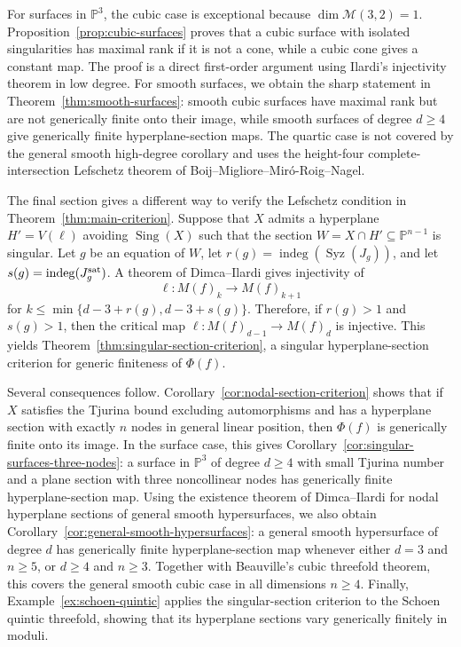 \documentclass[11pt]{amsart}
\theoremstyle{plain}
\theoremstyle{definition}
\numberwithin{equation}{section}
\newcommand{\M}{{\mathcal M}}
\newcommand{\PP}{\mathbb{P}}
\DeclareMathOperator{\Sing}{Sing}
\begin{document}
For surfaces in $\PP^3$, the cubic case is exceptional because $\dim\M(3,2)=1$. Proposition~\ref{prop:cubic-surfaces} proves that a cubic surface with isolated singularities has maximal rank if it is not a cone, while a cubic cone gives a constant map. The proof is a direct first-order argument using Ilardi's injectivity theorem in low degree. For smooth surfaces, we obtain the sharp statement in Theorem~\ref{thm:smooth-surfaces}: smooth cubic surfaces have maximal rank but are not generically finite onto their image, while smooth
surfaces of degree $d\geq4$ give generically finite hyperplane-section maps. The quartic case is not covered by the general smooth high-degree corollary and uses the height-four complete-intersection Lefschetz theorem of Boij--Migliore--Mir\'o-Roig--Nagel.

The final section gives a different way to verify the Lefschetz condition in Theorem~\ref{thm:main-criterion}. Suppose that $X$ admits a hyperplane
$H'=V(\ell)$ avoiding $\Sing(X)$ such that the section
$W=X\cap H'\subseteq\PP^{n-1}$ is singular. Let $g$ be an equation of $W$, let
$r(g)=\operatorname{indeg}(\operatorname{Syz}(J_g))$, and let
$s(g)=\operatorname{indeg}(J_g^{\rm sat})$. A theorem of Dimca--Ilardi gives injectivity of
\[
\ell:M(f)_k\to M(f)_{k+1}
\]
for $k\leq\min\{d-3+r(g),d-3+s(g)\}$. Therefore, if $r(g)>1$ and $s(g)>1$, then
the critical map $\ell:M(f)_{d-1}\to M(f)_d$ is injective. This yields
Theorem~\ref{thm:singular-section-criterion}, a singular hyperplane-section criterion for generic finiteness of $\Phi(f)$.

Several consequences follow. Corollary~\ref{cor:nodal-section-criterion} shows that if $X$ satisfies the Tjurina bound excluding automorphisms and has a
hyperplane section with exactly $n$ nodes in general linear position, then $\Phi(f)$ is generically finite onto its image. In the surface case, this gives
Corollary~\ref{cor:singular-surfaces-three-nodes}: a surface in $\PP^3$ of degree $d\geq4$ with small Tjurina number and a plane section with three
noncollinear nodes has generically finite hyperplane-section map. Using the existence theorem of Dimca--Ilardi for nodal hyperplane sections of general
smooth hypersurfaces, we also obtain
Corollary~\ref{cor:general-smooth-hypersurfaces}: a general smooth hypersurface
of degree $d$ has generically finite hyperplane-section map whenever either
$d=3$ and $n\geq5$, or $d\geq4$ and $n\geq3$. Together with Beauville's cubic threefold theorem, this covers the general smooth cubic case in all dimensions
$n\geq4$. Finally, Example~\ref{ex:schoen-quintic} applies the singular-section criterion to the Schoen quintic threefold, showing that its hyperplane sections
vary generically finitely in moduli.
\end{document}
